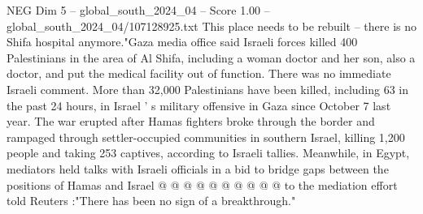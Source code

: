 \begin{textsample}{NEG Dim 5 – global\_south\_2024\_04 – Score 1.00 – global\_south\_2024\_04/107128925.txt}
This place needs to be rebuilt -- there is no Shifa hospital anymore."Gaza media office said Israeli forces killed 400 Palestinians in the area of Al Shifa, including a woman doctor and her son, also a doctor, and put the medical facility out of function.
There was no immediate Israeli comment.
More than 32,000 Palestinians have been killed, including 63 in the past 24 hours, in Israel ' s military offensive in Gaza since October 7 last year.
The war erupted after Hamas fighters broke through the border and rampaged through settler-occupied communities in southern Israel, killing 1,200 people and taking 253 captives, according to Israeli tallies.
Meanwhile, in Egypt, mediators held talks with Israeli officials in a bid to bridge gaps between the positions of Hamas and Israel @ @ @ @ @ @ @ @ @ @ to the mediation effort told Reuters :"There has been no sign of a breakthrough."

\end{textsample}
